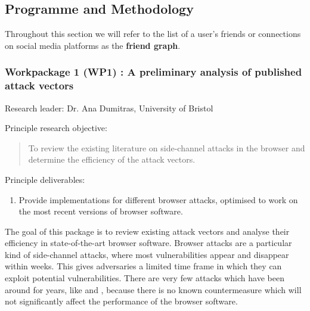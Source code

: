 \documentclass[a4paper,11pt]{article}
\begin{document}

\subsection*{Programme and Methodology}
Throughout this section we will refer to the list of a user's friends or connections on social media platforms as the \textbf{friend graph}.


\subsubsection*{Workpackage 1 (WP1) : A preliminary analysis of published attack vectors}
Research leader: Dr. Ana Dumitras, University of Bristol

Principle research objective:
\begin{quote}
	To review the existing literature on side-channel attacks in the browser and determine the efficiency of the attack vectors.
\end{quote}

Principle deliverables:
\begin{enumerate}
\item Provide implementations for different browser attacks, optimised to work on the most recent versions of browser software.
\end{enumerate}

The goal of this package is to review existing attack vectors and analyse their efficiency in state-of-the-art browser software. Browser attacks are a particular kind of side-channel attacks, where most vulnerabilities appear and disappear within weeks. This gives adversaries a limited time frame in which they can exploit potential vulnerabilities. There are very few attacks which have been around for years, like \cite{felten2000timing} and \cite{bortz2007exposing}, because there is no known countermeasure which will not significantly affect the performance of the browser software.
\end{document}
